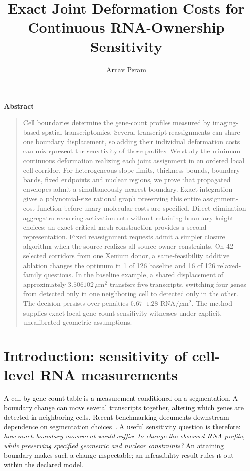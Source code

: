 \documentclass[10pt,letterpaper]{article}
\title{Exact Joint Deformation Costs for Continuous RNA-Ownership Sensitivity}
\author{Arnav Peram}
\date{}
\renewenvironment{abstract}{\begin{center}\bfseries Abstract\end{center}\begin{quote}\normalsize}{\end{quote}}
\begin{document}
\maketitle
\begin{abstract}
Cell boundaries determine the gene-count profiles measured by imaging-based spatial transcriptomics. Several transcript reassignments can share one boundary displacement, so adding their individual deformation costs can misrepresent the sensitivity of those profiles. We study the minimum continuous deformation realizing each joint assignment in an ordered local cell corridor. For heterogeneous slope limits, thickness bounds, boundary bands, fixed endpoints and nuclear regions, we prove that propagated envelopes admit a simultaneously nearest boundary. Exact integration gives a polynomial-size rational graph preserving this entire assignment-cost function before unary molecular costs are specified. Direct elimination aggregates recurring activation sets without retaining boundary-height choices; an exact critical-mesh construction provides a second representation. Fixed reassignment requests admit a simpler closure algorithm when the source realizes all source-owner constraints. On 42 selected corridors from one Xenium donor, a same-feasibility additive ablation changes the optimum in 1 of 126 baseline and 16 of 126 relaxed-family questions. In the baseline example, a shared displacement of approximately $3.506102\,\mu$m$^2$ transfers five transcripts, switching four genes from detected only in one neighboring cell to detected only in the other. The decision persists over penalties $0.67$--$1.28$ RNA/$\mu$m$^2$. The method supplies exact local gene-count sensitivity witnesses under explicit, uncalibrated geometric assumptions.
\end{abstract}

\section{Introduction: sensitivity of cell-level RNA measurements}
A cell-by-gene count table is a measurement conditioned on a segmentation. A boundary change can move several transcripts together, altering which genes are detected in neighboring cells. Recent benchmarking documents downstream dependence on segmentation choices~\cite{benchmark2026}. A useful sensitivity question is therefore: \emph{how much boundary movement would suffice to change the observed RNA profile, while preserving specified geometric and nuclear constraints?} An attaining boundary makes such a change inspectable; an infeasibility result rules it out within the declared model.
\end{document}
